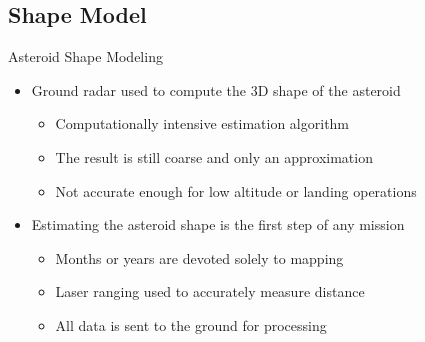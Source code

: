 \documentclass[11pt,professionalfonts]{beamer}
\begin{document}
\subsection[Shape Model]{Shape Model}
\begin{frame}{Asteroid Shape Modeling}
    \begin{itemize}
        \item<1-> Ground radar used to compute the 3D shape of the asteroid
        \begin{itemize}
            \item Computationally intensive estimation algorithm 
            \item The result is still coarse and only an approximation
            \item Not accurate enough for low altitude or landing operations
        \end{itemize}
    \item<2-> Estimating the asteroid shape is the first step of any mission
    \begin{itemize}
        \item Months or years are devoted solely to mapping
        \item Laser ranging used to accurately measure distance
        \item All data is sent to the ground for processing
    \end{itemize}
    \end{itemize}
    
\end{frame}
\end{document}
